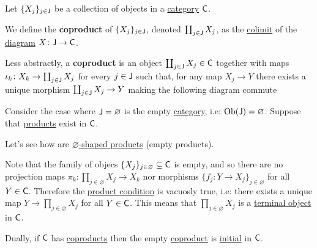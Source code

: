 \documentclass[../../main]{subfiles}
\begin{document}
\begin{definition}[Coproduct]\label{def:categorical-coproduct}
  Let \(\{X_{j}\}_{j \in \mathsf{J}}\) be a collection of objects in a \hyperref[def:category]{category} \(\mathsf{C}\).

  We define the \textbf{coproduct} of \(\{X_{j}\}_{j \in \mathsf{J}}\), denoted \(\coprod_{j \in \mathsf{J}} X_{j}\), as the \hyperref[def:categorical-colimit]{colimit} of the \hyperref[def:diagram]{diagram} \(X\colon \mathsf{J} \to \mathsf{C}\).


  Less abstractly, a \textbf{coproduct} is an object \(\coprod_{j \in \mathsf{J}} X_{j} \in \mathsf{C}\) together with maps \(\iota_{k}\colon X_{k} \to \coprod_{j \in \mathsf{J}} X_{j}\) for every \(j \in \mathsf{J}\) such that, for any map \(X_{j} \to Y\) there exists a unique morphism \(\coprod_{j \in \mathsf{J}} X_{j} \to Y\) making the following diagram commute
  \begin{center}
  \end{center}
\end{definition}

\begin{remark}\label{rem:empty-product-is-terminal}
  Consider the case where \(\mathsf{J} = \varnothing\) is the empty \hyperref[def:category]{category}, i.e: \(\operatorname{Ob}(\mathsf{J}) = \varnothing\).
  Suppose that \hyperref[def:categorical-product]{products} exist in \(\mathsf{C}\).

  Let's see how are \hyperref[def:categorical-product]{\(\varnothing\)-shaped products} (empty products).

  Note that the family of objecs \(\{X_{j}\}_{j \in \varnothing} \subseteq \mathsf{C}\) is empty, and so there are no projection maps \(\pi_{k}: \prod_{j \in \varnothing} X_{j} \to X_{k}\) nor morphisms \(\{f_{j}: Y \to X_{j}\}_{j \in \varnothing}\) for all \(Y \in \mathsf{C}\).
  Therefore the \hyperref[def:categorical-product]{product condition} is vacuosly true, i.e: there exists a unique map \(Y \to \prod_{j \in \varnothing} X_{j}\) for all \(Y \in \mathsf{C}\).
  This means that \(\prod_{j \in \varnothing} X_{j}\) is a \hyperref[def:initial-terminal-object]{terminal object} in \(\mathsf{C}\).

  Dually, if \(\mathsf{C}\) has \hyperref[def:categorical-coproduct]{coproducts} then the empty \hyperref[def:categorical-coproduct]{coproduct} is \hyperref[def:initial-terminal-object]{initial} in \(\mathsf{C}\).
\end{remark}
\end{document}
